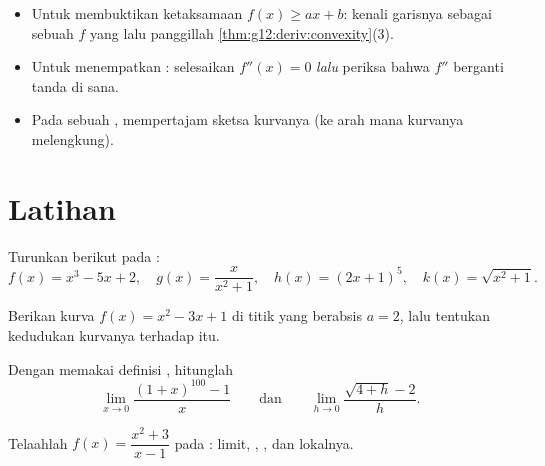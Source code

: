 \begin{method}\label{met:g12:deriv:convexity}
\begin{itemize}
  \item Untuk membuktikan ketaksamaan $f(x) \geq ax + b$: kenali garisnya
        sebagai  sebuah $f$ yang  lalu panggillah
        \cref{thm:g12:deriv:convexity}(3).
  \item Untuk menempatkan : selesaikan $f''(x) = 0$ \emph{lalu}
        periksa bahwa $f''$ berganti tanda di sana.
  \item Pada sebuah ,  mempertajam sketsa kurvanya
        (ke arah mana kurvanya melengkung).
\end{itemize}
\end{method}

\section{Latihan}

\begin{exercise}[$\star$]\label{exo:g12:deriv:1}
Turunkan  berikut pada :
\[
f(x) = x^3 - 5x + 2, \quad
g(x) = \frac{x}{x^2+1}, \quad
h(x) = (2x+1)^5, \quad
k(x) = \sqrt{x^2 + 1}.
\]
\end{exercise}

\begin{exercise}[$\star$]\label{exo:g12:deriv:2}
Berikan   kurva $f(x) = x^2 - 3x + 1$ di
titik yang berabsis $a = 2$, lalu tentukan kedudukan kurvanya
terhadap  itu.
\end{exercise}

\begin{exercise}[$\star$]\label{exo:g12:deriv:3}
Dengan memakai definisi , hitunglah
\[
\lim_{x \to 0} \frac{(1+x)^{100} - 1}{x}
\qquad\text{dan}\qquad
\lim_{h \to 0} \frac{\sqrt{4+h} - 2}{h}.
\]
\end{exercise}

\begin{exercise}[$\star\star$]\label{exo:g12:deriv:4}
Telaahlah  $f(x) = \dfrac{x^2 + 3}{x - 1}$ pada : limit,
, , dan  lokalnya.
\end{exercise}

